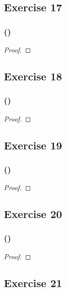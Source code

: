 \documentclass[14pt]{extarticle}
\begin{document}
\subsection{Exercise 17}

\subsubsection{()}

\begin{proof}

\end{proof}

\subsection{Exercise 18}

\subsubsection{()}

\begin{proof}

\end{proof}

\subsection{Exercise 19}

\subsubsection{()}

\begin{proof}

\end{proof}

\subsection{Exercise 20}

\subsubsection{()}

\begin{proof}

\end{proof}

\subsection{Exercise 21}
\end{document}

